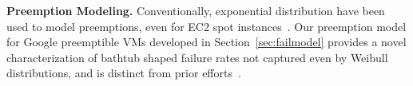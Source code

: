 




\noindent \textbf{Preemption Modeling.}
Conventionally, exponential distribution have been used to model preemptions, even for EC2 spot instances~\cite{bid-cloud, flint, hotcloud-not-bid}. 
Our preemption model for Google preemptible VMs developed in Section~\ref{sec:failmodel} provides a novel characterization of bathtub shaped failure rates not captured even by Weibull distributions, and is distinct from prior efforts~\cite{mudholkar1993exponentiated, crevecoeur1993model}. 










